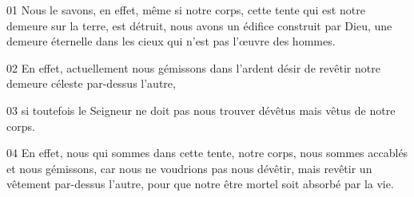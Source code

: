 01 Nous le savons, en effet, même si notre corps, cette tente qui est notre demeure sur la terre, est détruit, nous avons un édifice construit par Dieu, une demeure éternelle dans les cieux qui n’est pas l’œuvre des hommes.

02 En effet, actuellement nous gémissons dans l’ardent désir de revêtir notre demeure céleste par-dessus l’autre,

03 si toutefois le Seigneur ne doit pas nous trouver dévêtus mais vêtus de notre corps.

04 En effet, nous qui sommes dans cette tente, notre corps, nous sommes accablés et nous gémissons, car nous ne voudrions pas nous dévêtir, mais revêtir un vêtement par-dessus l’autre, pour que notre être mortel soit absorbé par la vie.

